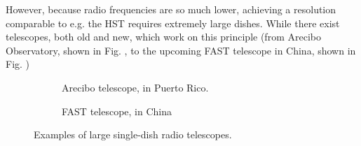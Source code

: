 \pg
However, because radio frequencies are so much lower, achieving a resolution comparable to e.g. the HST requires extremely large dishes. While there exist telescopes, both old and new, which work on this principle (from Arecibo Observatory, shown in Fig. , to the upcoming FAST telescope in China, shown in Fig. )

\begin{figure}[ht]
\centering
\begin{subfigure}{.43\textwidth}
\caption{\label{fig.arecibo} Arecibo telescope, in Puerto Rico.}
\end{subfigure}
\hfill
\begin{subfigure}{.43\textwidth}
\caption{\label{fig.FAST} FAST telescope, in China}
\end{subfigure}
\caption{\label{fig.singleDishes} Examples of large single-dish radio telescopes.}
\end{figure}

